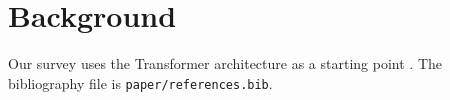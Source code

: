 \section{Background}
Our survey uses the Transformer architecture as a starting point
\cite{vaswani2017attention}. The bibliography file is
\texttt{paper/references.bib}.
